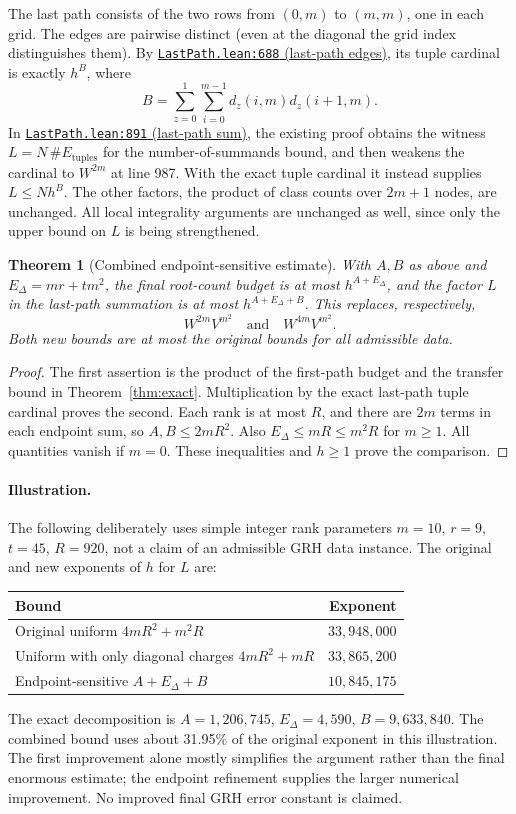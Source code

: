 \documentclass[11pt]{article}
\newtheorem{theorem}{Theorem}[section]
\newcommand{\base}{https://github.com/VladimirReshetnikov/ProveIt/blob/835c3695d07c0f77060c5cc63f92eeb52a7d21c2/Analysis/GeneralizedRiemannHypothesis}
\newcommand{\auxlink}[3]{\href{\base/Lean/grh/src/New/Determinant/AuxiliaryForms/#1.lean\#L#2}{\texttt{#1.lean:#2} (#3)}}
\begin{document}
The last path consists of the two rows from $(0,m)$ to $(m,m)$, one in each grid. The edges are pairwise distinct (even at the diagonal the grid index distinguishes them). By \auxlink{LastPath}{688}{last-path edges}, its tuple cardinal is exactly $h^B$, where
\[
B=\sum_{z=0}^1\sum_{i=0}^{m-1}d_z(i,m)d_z(i+1,m).
\]
In \auxlink{LastPath}{891}{last-path sum}, the existing proof obtains the witness $L=N\,\#E_{\mathrm{tuples}}$ for the number-of-summands bound, and then weakens the cardinal to $W^{2m}$ at line 987. With the exact tuple cardinal it instead supplies $L\le Nh^B$. The other factors, the product of class counts over $2m+1$ nodes, are unchanged. All local integrality arguments are unchanged as well, since only the upper bound on $L$ is being strengthened.

\begin{theorem}[Combined endpoint-sensitive estimate]
With $A,B$ as above and $E_\Delta=mr+tm^2$, the final root-count budget is at most $h^{A+E_\Delta}$, and the factor $L$ in the last-path summation is at most $h^{A+E_\Delta+B}$. This replaces, respectively,
\[
W^{2m}V^{m^2}\quad\text{and}\quad W^{4m}V^{m^2}.
\]
Both new bounds are at most the original bounds for all admissible data.
\end{theorem}
\begin{proof}
The first assertion is the product of the first-path budget and the transfer bound in Theorem~\ref{thm:exact}. Multiplication by the exact last-path tuple cardinal proves the second. Each rank is at most $R$, and there are $2m$ terms in each endpoint sum, so $A,B\le2mR^2$. Also $E_\Delta\le mR\le m^2R$ for $m\ge1$. All quantities vanish if $m=0$. These inequalities and $h\ge1$ prove the comparison.
\end{proof}

\paragraph{Illustration.} The following deliberately uses simple integer rank parameters $m=10$, $r=9$, $t=45$, $R=920$, not a claim of an admissible GRH data instance. The original and new exponents of $h$ for $L$ are:
\begin{center}
\begin{tabular}{lr}
\toprule
Bound & Exponent \\
\midrule
Original uniform $4mR^2+m^2R$ & $33,948,000$ \\
Uniform with only diagonal charges $4mR^2+mR$ & $33,865,200$ \\
Endpoint-sensitive $A+E_\Delta+B$ & $10,845,175$ \\
\bottomrule
\end{tabular}
\end{center}
The exact decomposition is $A=1,206,745$, $E_\Delta=4,590$, $B=9,633,840$. The combined bound uses about 31.95\% of the original exponent in this illustration. The first improvement alone mostly simplifies the argument rather than the final enormous estimate; the endpoint refinement supplies the larger numerical improvement. No improved final GRH error constant is claimed.
\end{document}
